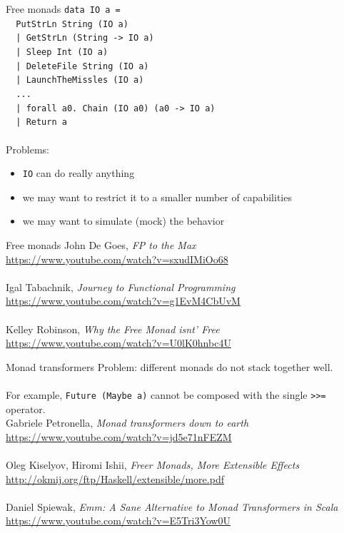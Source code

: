 \documentclass{beamer}
\begin{document}
\begin{frame}{Free monads} \pause
  \texttt{data IO a = \\
    \ \ PutStrLn String (IO a) \\
    \ \ | GetStrLn (String -> IO a) \\
    \ \ | Sleep Int (IO a) \\
    \ \ | DeleteFile String (IO a) \\
    \ \ | LaunchTheMissles (IO a) \\
    \ \ ... \\
    \ \ | forall a0. Chain (IO a0) (a0 -> IO a) \\
    \ \ | Return a \\
  }
  \ \\ \pause
  Problems: \pause
  \begin{itemize}
  \item \texttt{IO} can do really anything \pause
  \item we may want to restrict it to a smaller number of capabilities \pause
  \item we may want to simulate (mock) the behavior
  \end{itemize}
\end{frame}

\begin{frame}{Free monads}
  John De Goes, \textit{FP to the Max} \\
  \url{https://www.youtube.com/watch?v=sxudIMiOo68} \\ \pause
  \ \\
  Igal Tabachnik, \textit{Journey to Functional Programming} \\
  \url{https://www.youtube.com/watch?v=g1EvM4CbUvM} \\ \pause
  \ \\
  Kelley Robinson, \textit{Why the Free Monad isnt' Free} \\
  \url{https://www.youtube.com/watch?v=U0lK0hnbc4U}
    
\end{frame}

\begin{frame}{Monad transformers}
  Problem: different monads do not stack together well. \\
  \ \\ \pause
  For example, \texttt{Future (Maybe a)} cannot be composed
  with the single \texttt{>>=} operator. \\ \pause
  Gabriele Petronella, \textit{Monad transformers down to earth} \\
  \url{https://www.youtube.com/watch?v=jd5e71nFEZM} \\ \pause
  \ \\
  Oleg Kiselyov, Hiromi Ishii, \textit{Freer Monads, More Extensible Effects} \\
  \url{http://okmij.org/ftp/Haskell/extensible/more.pdf} \\ \pause
  \ \\
  Daniel Spiewak, \textit{Emm: A Sane Alternative to Monad Transformers in Scala}
  \\ \url{https://www.youtube.com/watch?v=E5Tri3Yow0U}
\end{frame}
\end{document}
